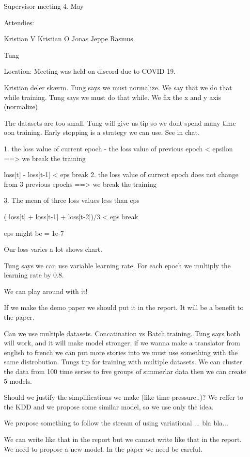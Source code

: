 Supervisor meeting 4. May

Attendies:

Kristian V
Kristian O
Jonas
Jeppe
Rasmus

Tung

Location: Meeting was held on discord due to COVID 19.

Kristian deler skærm. Tung says we must normalize. We say that we do that while training. Tung says we must do that while. We fix the x and y axis (normalize)

The datasets are too small. Tung will give us tip so we dont spend many time oon training. Early stopping is a strategy we can use. See in chat.

1. the loss value of current epoch - the loss value of previous epoch < epsilon ==> we break the training

loss[t] - loss[t-1] < eps
  break
2. the loss value of current epoch does not change from 3 previous epochs ==> we break the training

3. The mean of three loss values less than eps

( loss[t] + loss[t-1] +  loss[t-2])/3 < eps
  break
  
eps might be = 1e-7

Our loss varies a lot shows chart.

Tung says we can use variable learning rate. For each epoch we multiply the learning rate by 0.8.

We can play around with it!

If we make the demo paper we should put it in the report. It will be a benefit to the paper.

Can we use multiple datasets. Concatination vs Batch training.
Tung says both will work, and it will make model stronger, if we wanna make a translator from english to french we can put more stories into we must use something with the same distrobution. 
Tungs tip for training with multiple datasets. We can cluster the data from 100 time series to five groups of simmerlar data then we can create 5 models.


Should we justify the simplifications we make (like time pressure..)?
We reffer to the KDD and we propose some similar model, so we use only the idea.

We propose something to follow the stream of using variational ... bla bla... 

We can write like that in the report but we cannot write like that in the report. We need to propose a new model. In the paper we need be careful.
